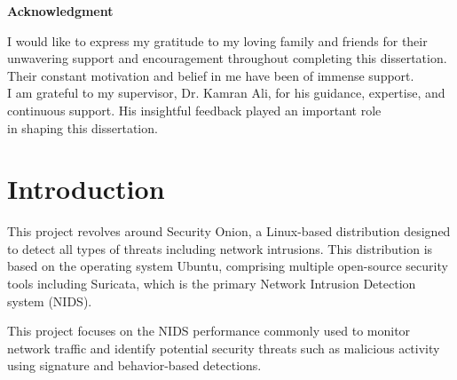 \documentclass[12pt]{article}
\begin{document}
	\restoregeometry
	
	
	\newpage	
	
	
	\begin{center}
		
		
		\vspace*{\fill}
		
		\textbf{Acknowledgment}
		\vspace{1cm} %
		
		
		
		I would like to express my  gratitude to my loving family and friends for their \\
		unwavering support and encouragement throughout completing this dissertation. Their constant motivation and belief in me have been of immense support.\\
		
		
		I am  grateful to my supervisor, Dr. Kamran Ali, for his guidance, expertise, and\\
		continuous support. His insightful feedback played an important role\\ in shaping this dissertation.\\
		
		\vspace*{\fill}
		
	\end{center}
	\vspace*{\fill}
	
	
	\restoregeometry
	
	\newpage
	
	
	
	
	\section{Introduction}
	
	
	This project revolves around Security Onion, a Linux-based distribution designed to detect all types of threats including network intrusions. This distribution is based on the operating system Ubuntu, comprising multiple open-source security tools including Suricata, which is the primary Network Intrusion Detection system (NIDS).
	
	This project focuses on the NIDS performance commonly used to monitor network traffic and identify potential security threats such as malicious activity using signature and behavior-based detections.
	
\end{document}
